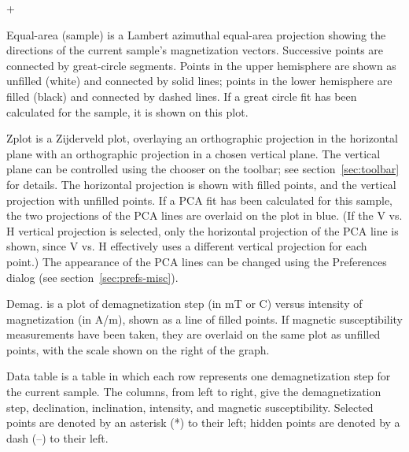 \documentclass[a4paper,british]{article}
\newcommand{\menuitemlabel}[1]{%
\mbox{\textsf{#1}}\hfil}
\newenvironment{menuitemlist}%
{\begin{list}{}{%
\renewcommand{\makelabel}{\menuitemlabel}%
\setlength{\labelwidth}{35pt}%
\setlength{\leftmargin}%
             {\labelwidth+\labelsep}}}%
{\end{list}}
\newcommand{\ppcmd}[1]{\textsf{#1}} %
\newcommand{\caps}[1]{\MakeTextUppercase{#1}} %
\begin{document}
\begin{menuitemlist}

\item[Equal-area (sample)] is a Lambert azimuthal equal-area projection
  showing the directions of the current sample's magnetization vectors.
  Successive points are connected by great-circle segments. Points in the
  upper hemisphere are shown as unfilled (white) and connected by solid
  lines; points in the lower hemisphere are filled (black) and connected by
  dashed lines. If a great circle fit has been calculated for the sample, it
  is shown on this plot.

\item[Zplot] is a Zijderveld plot, overlaying an orthographic projection in
  the horizontal plane with an orthographic projection in a chosen vertical
  plane. The vertical plane can be controlled using the chooser on the
  toolbar; see section~\ref{sec:toolbar} for details. The horizontal
  projection is shown with filled points, and the vertical projection with
  unfilled points. If a \caps{pca} fit has been calculated for this sample,
  the two projections of the \caps{pca} lines are overlaid on the plot in
  blue. (If the \ppcmd{V vs. H} vertical projection is selected, only the
  horizontal projection of the \caps{pca} line is shown, since \ppcmd{V vs.
    H} effectively uses a different vertical projection for each point.) The
  appearance of the \caps{pca} lines can be changed using the Preferences dialog
  (see section~\ref{sec:prefs-misc}).

\item[Demag.] is a plot of demagnetization step (in mT or \textdegree C)
  versus intensity of magnetization (in A/m), shown as a line of filled
  points. If magnetic susceptibility measurements have been taken, they are
  overlaid on the same plot as unfilled points, with the scale shown on the
  right of the graph.

\item[Data table] is a table in which each row represents one demagnetization
  step for the current sample. The columns, from left to right, give the
  demagnetization step, declination, inclination, intensity, and magnetic
  susceptibility. Selected points are denoted by an asterisk (*) to their
  left; hidden points are denoted by a dash (--) to their left.


\end{menuitemlist}
\end{document}
